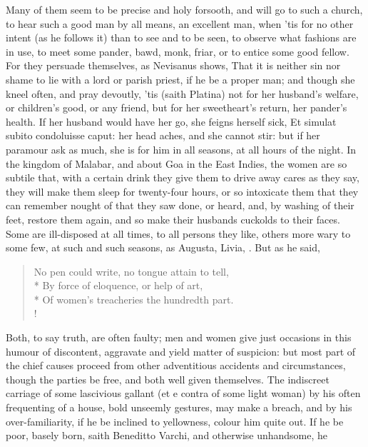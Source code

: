 %
Many of them seem to be precise and holy forsooth, and will go to such
a church, to hear such a good man by all means, an excellent man,
when 'tis for no other intent (as he follows it) than to see and to be
seen, to observe what fashions are in use, to meet some pander, bawd,
monk, friar, or to entice some good fellow. For they persuade
themselves, as  Nevisanus shows, That it is neither sin nor shame
to lie with a lord or parish priest, if he be a proper man; and
though she kneel often, and pray devoutly, 'tis (saith Platina) not for
her husband's welfare, or children's good, or any friend, but for her
sweetheart's return, her pander's health. If her husband would have her
go, she feigns herself sick, Et simulat subito condoluisse caput:
her head aches, and she cannot stir: but if her paramour ask as much,
she is for him in all seasons, at all hours of the night. In the
kingdom of Malabar, and about Goa in the East Indies, the women are so
subtile that, with a certain drink they give them to drive away cares
as they say, they will make them sleep for twenty-four hours, or
so intoxicate them that they can remember nought of that they saw done,
or heard, and, by washing of their feet, restore them again, and so
make their husbands cuckolds to their faces. Some are ill-disposed at
all times, to all persons they like, others more wary to some few, at
such and such seasons, as Augusta, Livia, . But as he said,
%
\begin{verse}%
No pen could write, no tongue attain to tell,\\*
By force of eloquence, or help of art,\\*
Of women's treacheries the hundredth part.\\!
\end{verse}%
%
Both, to say truth, are often faulty; men and women give just occasions
in this humour of discontent, aggravate and yield matter of suspicion:
but most part of the chief causes proceed from other adventitious
accidents and circumstances, though the parties be free, and both well
given themselves. The indiscreet carriage of some lascivious gallant
(et e contra of some light woman) by his often frequenting of a house,
bold unseemly gestures, may make a breach, and by his over-familiarity,
if he be inclined to yellowness, colour him quite out. If he be poor,
basely born, saith Beneditto Varchi, and otherwise unhandsome, he
